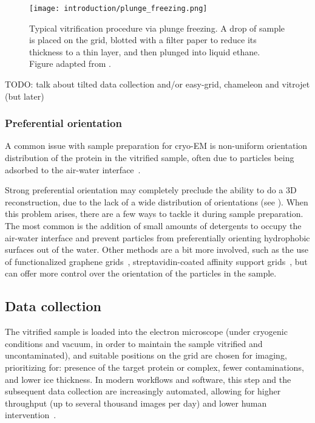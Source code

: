 \begin{figure}[ht]
    \centering
    \texttt{[image: introduction/plunge\_freezing.png]}
    \caption[Vitrification via plunge freezing]{Typical vitrification procedure via plunge freezing. A drop of sample is placed on the grid, blotted with a filter paper to reduce its thickness to a thin layer, and then plunged into liquid ethane. Figure adapted from \citet{chungNobelPrizeChemistry2017}.}
    \label{fig:em_plunge_freezing}
\end{figure}

TODO: talk about tilted data collection and/or easy-grid, chameleon and vitrojet (but later)

\subsubsection{Preferential orientation}
A common issue with sample preparation for cryo-EM is non-uniform orientation distribution of the protein in the vitrified sample, often due to particles being adsorbed to the air-water interface~\cite{nobleRoutineSingleParticle2018}.

Strong preferential orientation may completely preclude the ability to do a 3D reconstruction, due to the lack of a wide distribution of orientations (see ).
When this problem arises, there are a few ways to tackle it during sample preparation.
The most common is the addition of small amounts of detergents to occupy the air-water interface and prevent particles from preferentially orienting hydrophobic surfaces out of the water.
Other methods are a bit more involved, such as the use of functionalized graphene grids~\cite{luFunctionalizedGrapheneGrids2022}, streptavidin-coated affinity support grids~\cite{crucifixImmobilizationBiotinylatedDNA2004,hanLongShelflifeStreptavidin2016}, but can offer more control over the orientation of the particles in the sample.

\subsection{Data collection}
The vitrified sample is loaded into the electron microscope (under cryogenic conditions and vacuum, in order to maintain the sample vitrified and uncontaminated), and suitable positions on the grid are chosen for imaging, prioritizing for: presence of the target protein or complex, fewer contaminations, and lower ice thickness.
In modern workflows and software, this step and the subsequent data collection are increasingly automated, allowing for higher throughput (up to several thousand images per day) and lower human intervention~\cite{schorbSoftwareToolsAutomated2019}.

